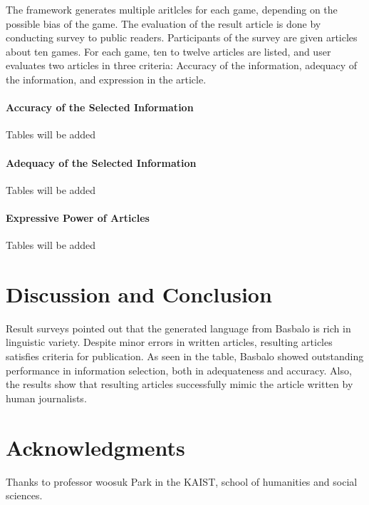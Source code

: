 \documentclass[11pt,letterpaper]{article}
\begin{document}
The framework generates multiple aritlcles for each game, depending on the possible bias of the game. 
The evaluation of the result article is done by conducting survey to public readers. Participants of the survey are given articles about ten games. For each game, ten to twelve articles are listed, and user evaluates two articles in three criteria: Accuracy of the information, adequacy of the information, and expression in the article. 

\paragraph{Accuracy of the Selected Information}

Tables will be added

\paragraph{Adequacy of the Selected Information} 

Tables will be added

\paragraph{Expressive Power of Articles} 

Tables will be added


\section{Discussion and Conclusion}

Result surveys pointed out that the generated language from Basbalo is rich in linguistic variety. Despite minor errors in written articles, resulting articles satisfies criteria for publication. 
As seen in the table, Basbalo showed outstanding performance in information selection, both in adequateness and accuracy. Also, the results show that resulting articles successfully mimic the article written by human journalists. 

\section*{Acknowledgments}

Thanks to professor woosuk Park in the KAIST, school of humanities and social sciences. 



\end{document}
